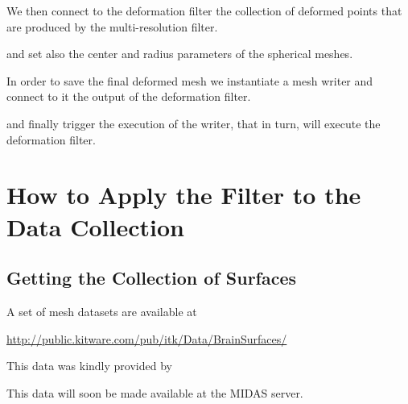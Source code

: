 \documentclass{InsightArticle}
\begin{document}
We then connect to the deformation filter the collection of deformed points that
are produced by the multi-resolution filter.

\begin{center}

\end{center}

and set also the center and radius parameters of the spherical meshes.

\begin{center}

\end{center}


In order to save the final deformed mesh we instantiate a mesh writer and
connect to it the output of the deformation filter.

\begin{center}

\end{center}

and finally trigger the execution of the writer, that in turn, will execute the
deformation filter.

\begin{center}

\end{center}


\section{How to Apply the Filter to the Data Collection}

\subsection{Getting the Collection of Surfaces}

A set of mesh datasets are available at

\url{http://public.kitware.com/pub/itk/Data/BrainSurfaces/}

This data was kindly provided by 


This data will soon be made available at the MIDAS server.




\clearpage


%
%



\end{document}
